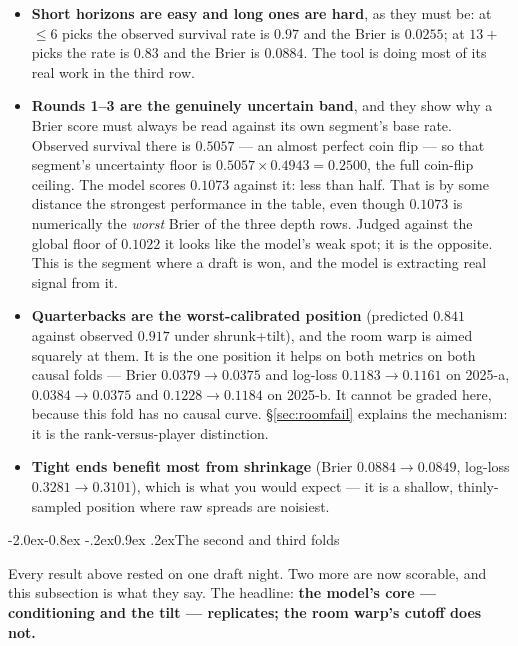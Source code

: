 \documentclass[10pt,a4paper]{article}
\makeatletter
\theoremstyle{plain}
\theoremstyle{definition}
\theoremstyle{remark}
\renewcommand\subsection{\@startsection{subsection}{2}{\z@}%
  {-2.0ex\@plus -0.8ex \@minus -.2ex}{0.9ex \@plus .2ex}{\normalfont\large\bfseries}}
\makeatother
\begin{document}
\begin{itemize}
\item \textbf{Short horizons are easy and long ones are hard}, as they must be: at
$\le 6$ picks the observed survival rate is $0.97$ and the Brier is $0.0255$; at $13+$
picks the rate is $0.83$ and the Brier is $0.0884$. The tool is doing most of its real
work in the third row.

\item \textbf{Rounds 1--3 are the genuinely uncertain band}, and they show why a Brier
score must always be read against its own segment's base rate. Observed survival there is
$0.5057$ --- an almost perfect coin flip --- so that segment's uncertainty floor is
$0.5057 \times 0.4943 = 0.2500$, the full coin-flip ceiling. The model scores $0.1073$
against it: less than half. That is by some distance the strongest performance in the
table, even though $0.1073$ is numerically the \emph{worst} Brier of the three depth
rows. Judged against the global floor of $0.1022$ it looks like the model's weak spot; it
is the opposite. This is the segment where a draft is won, and the model is extracting
real signal from it.

\item \textbf{Quarterbacks are the worst-calibrated position} (predicted $0.841$ against
observed $0.917$ under shrunk+tilt), and the room warp is aimed squarely at them. It is
the one position it helps on both metrics on both causal folds --- Brier
$0.0379 \to 0.0375$ and log-loss $0.1183 \to 0.1161$ on 2025-a, $0.0384 \to 0.0375$ and
$0.1228 \to 0.1184$ on 2025-b. It cannot be graded here, because this fold has no causal
curve. \S\ref{sec:roomfail} explains the mechanism: it is the rank-versus-player
distinction.

\item \textbf{Tight ends benefit most from shrinkage} (Brier $0.0884 \to 0.0849$,
log-loss $0.3281 \to 0.3101$), which is what you would expect --- it is a shallow,
thinly-sampled position where raw spreads are noisiest.
\end{itemize}

\subsection{The second and third folds}
\label{sec:crossfold}

Every result above rested on one draft night. Two more are now scorable, and this
subsection is what they say. The headline: \textbf{the model's core --- conditioning and
the tilt --- replicates; the room warp's cutoff does not.}
\end{document}
